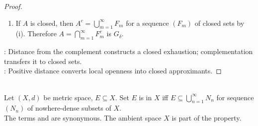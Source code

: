 \begin{proposition}
\begin{proof}
\begin{enumerate}[label=(\roman*)]
\begin{enumerate}[label=(\alph*)]
\end{enumerate}
\item If $A$ is closed, then $A^c=\bigcup\limits_{m=1}^{\infty}F_m$ for a sequence $(F_m)$ of closed sets by (i). Therefore $A=\bigcap\limits_{m=1}^{\infty}F_m^c$ is $G_\delta$.
\end{enumerate}
: Distance from the complement constructs a closed exhaustion; complementation transfers it to closed sets.\\
: Positive distance converts local openness into closed approximants.
\end{proof}
\end{proposition}

\begin{definition} \label{def:first-category-set} \\
Let $(X,d)$ be metric space, $E\subseteq X$. Set $E$ is  in $X$ iff $E\subseteq\bigcup\limits_{n=1}^{\infty}N_n$ for sequence $(N_n)$ of nowhere-dense subsets of $X$.\\
The terms  and  are synonymous. The ambient space $X$ is part of the property.
\end{definition}

